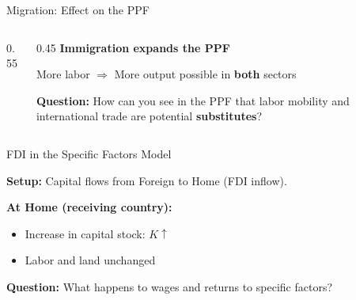 \begin{frame}{Migration: Effect on the PPF}

\begin{columns}[T]
\begin{column}{0.55\textwidth}
\centering
{}
\end{column}

\begin{column}{0.45\textwidth}
\textbf{Immigration expands the PPF}

\vspace{0.3cm}

More labor $\Rightarrow$ More output possible in \textbf{both} sectors

\vspace{0.3cm}

\textbf{Question:} How can you see in the PPF that labor mobility and international trade are potential \textbf{substitutes}?

\vspace{0.3cm}

\end{column}
\end{columns}

\end{frame}


\begin{frame}{FDI in the Specific Factors Model}

\textbf{Setup:} Capital flows from Foreign to Home (FDI inflow).

\vspace{0.3cm}

\textbf{At Home (receiving country):}
\begin{itemize}
    \item Increase in capital stock: $K \uparrow$
    \item Labor and land unchanged
\end{itemize}

\vspace{0.3cm}

\textbf{Question:} What happens to wages and returns to specific factors?

\end{frame}

